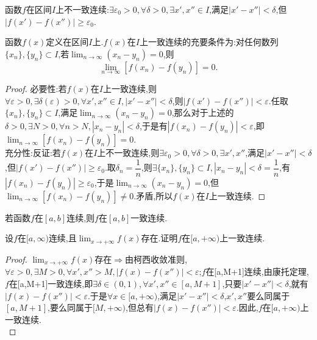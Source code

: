 函数$f$在区间$I$上不一致连续:$\exists \varepsilon_0>0,\forall\delta>0,\exists x',x''\in I$,满足$|x'-x''|<\delta$,但$|f(x')-f(x'')|\geq\varepsilon_0$.
\begin{theorem}
    函数$f(x)$定义在区间$I$上.$f(x)$在$I$上一致连续的充要条件为:对任何数列$\{x_n\},\{y_n\}\subset I$,若$\displaystyle\lim_{n\to\infty}(x_n-y_n)=0$,则
    \begin{equation*}
        \displaystyle\lim_{n\to\infty}[f(x_n)-f(y_n)]=0.
    \end{equation*}
\end{theorem}
\begin{proof}
    必要性:若$f(x)$在$I$上一致连续,则$\forall\varepsilon>0,\exists\delta(\varepsilon)>0,\forall x',x''\in I,|x'-x''|<\delta$,则$|f(x')-f(x'')|<\varepsilon$.任取$\{x_n\},\{y_n\}\subset I$,满足$\displaystyle\lim_{n\to\infty}(x_n-y_n)=0$,那么对于上述的$\delta>0,\exists N>0,\forall n>N,|x_n-y_n|<\delta$,于是有$|f(x_n)-f(y_n)|<\varepsilon$,即$\displaystyle\lim_{n\to\infty}[f(x_n)-f(y_n)]=0$.\\
    充分性:反证:若$f(x)$在$I$上不一致连续,则$\exists \varepsilon_0>0,\forall\delta>0,\exists x',x''$,满足$|x'-x''|<\delta$,但$|f(x')-f(x'')|\geq\varepsilon_0$.取$\displaystyle\delta_n=\dfrac{1}{n}$,则$\displaystyle\exists\{x_n\},\{y_n\}\subset I,|x_n-y_n|<\delta=\dfrac{1}{n}$,有$|f(x_n)-f(y_n)|\geq\varepsilon_0$,于是$\displaystyle\lim_{n\to\infty}(x_n-y_n)=0$,但$\displaystyle\lim_{n\to\infty}[f(x_n)-f(y_n)]\neq 0$.矛盾,所以$f(x)$在$I$上一致连续.
\end{proof}
\begin{theorem}[康托定理]
    若函数$f$在$[a,b]$连续,则$f$在$[a,b]$一致连续.
\end{theorem}
\begin{theorem}
    设$f$在$[a,\infty)$连续,且$\displaystyle\lim_{x\to +\infty} f(x)$存在.证明$f$在$[a,+\infty)$上一致连续.
\end{theorem}
\begin{proof}
    $\displaystyle\lim_{x\to +\infty} f(x)\text{存在}\Rightarrow$由柯西收敛准则,$\forall\varepsilon>0,\exists M>0,\forall x',x''>M,|f(x)-f(x'')|<\varepsilon$;$f$在[a,M+1]连续,由康托定理,$f$在[a,M+1]一致连续,即$\exists \delta\in(0,1),\forall x',x''\in[a,M+1]$,只要$|x'-x''|<\delta$,就有$|f(x)-f(x'')|<\varepsilon$.于是$\forall x\in[a,+\infty)$,满足$|x'-x''|<\delta$,$x',x''$要么同属于$[a,M+1]$,要么同属于$[M,+\infty)$,但总有$|f(x)-f(x'')|<\varepsilon$.因此,$f$在$[a,+\infty)$上一致连续.\\
\end{proof}
